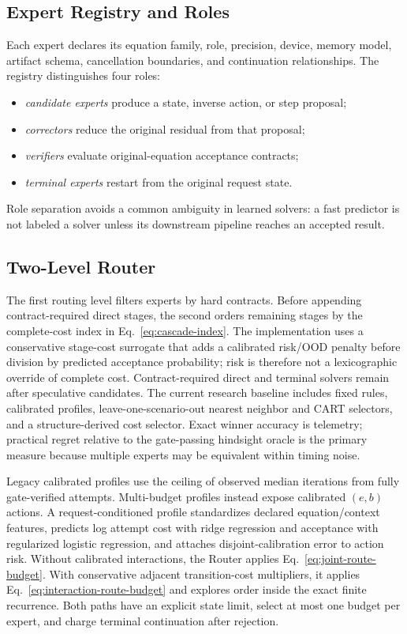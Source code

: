 \subsection{Expert Registry and Roles}

Each expert declares its equation family, role, precision, device, memory model,
artifact schema, cancellation boundaries, and continuation relationships. The registry
distinguishes four roles:

\begin{itemize}
  \item \emph{candidate experts} produce a state, inverse action, or step proposal;
  \item \emph{correctors} reduce the original residual from that proposal;
  \item \emph{verifiers} evaluate original-equation acceptance contracts;
  \item \emph{terminal experts} restart from the original request state.
\end{itemize}

Role separation avoids a common ambiguity in learned solvers: a fast predictor is
not labeled a solver unless its downstream pipeline reaches an accepted result.

\subsection{Two-Level Router}

The first routing level filters experts by hard contracts. Before appending
contract-required direct stages, the second orders remaining stages by the complete-cost index in
Eq.~\eqref{eq:cascade-index}. The implementation uses a conservative stage-cost
surrogate that adds a calibrated risk/OOD penalty before division by predicted
acceptance probability; risk is therefore not a lexicographic override of complete
cost. Contract-required direct and terminal solvers remain after speculative
candidates. The current research
baseline includes fixed rules, calibrated profiles, leave-one-scenario-out nearest
neighbor and CART selectors, and a structure-derived cost selector. Exact winner
accuracy is telemetry; practical regret relative to the gate-passing hindsight oracle is
the primary measure because multiple experts may be equivalent within timing
noise.

Legacy calibrated profiles use the ceiling of observed median iterations from fully
gate-verified attempts. Multi-budget profiles instead expose calibrated $(e,b)$
actions. A request-conditioned profile standardizes declared equation/context
features, predicts log attempt cost with ridge regression and acceptance with
regularized logistic regression, and attaches disjoint-calibration error to action
risk. Without calibrated interactions, the Router applies
Eq.~\eqref{eq:joint-route-budget}. With conservative adjacent transition-cost
multipliers, it applies Eq.~\eqref{eq:interaction-route-budget} and explores order
inside the exact finite recurrence. Both paths have an explicit state limit, select
at most one budget per expert, and charge terminal continuation after rejection.

